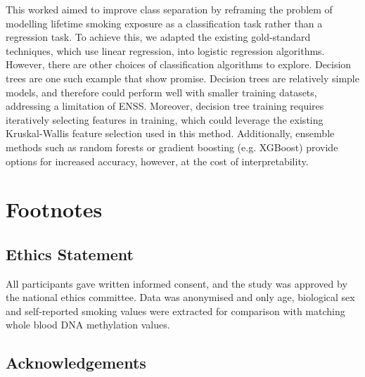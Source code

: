 \documentclass{article} %
\begin{document}
This worked aimed to improve class separation by reframing the problem of modelling lifetime smoking exposure as a classification task rather than a regression task. To achieve this, we adapted the existing gold-standard techniques, which use linear regression, into logistic regression algorithms. However, there are other choices of classification algorithms to explore. Decision trees are one such example that show promise. Decision trees are relatively simple models, and therefore could perform well with smaller training datasets, addressing a limitation of ENSS. Moreover, decision tree training requires iteratively selecting features in training, which could leverage the existing Kruskal-Wallis feature selection used in this method. Additionally, ensemble methods such as random forests or gradient boosting (e.g. XGBoost) provide options for increased accuracy, however, at the cost of interpretability.

\section{Footnotes}

\subsection{Ethics Statement}
All participants gave written informed consent, and the study was approved by the national ethics committee. Data was anonymised and only age, biological sex and self-reported smoking values were extracted for comparison with matching whole blood DNA methylation values.

\subsection{Acknowledgements}

\printbibliography
\end{document}
